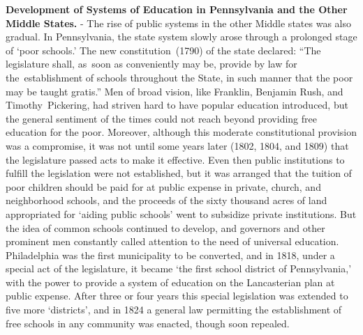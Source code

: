 \documentclass[]{book}
\begin{document}
\textbf{Development of Systems of Education in Pennsylvania and the Other Middle States.} - The rise of public systems in the other Middle states was also gradual. In Pennsylvania, the state system slowly arose through a prolonged stage of `poor schools.' The new constitution~(1790) of the state declared: ``The legislature shall, as~soon as conveniently may be, provide by law for the~establishment of schools throughout the State, in such manner that the poor may be taught gratis.'' Men of broad vision, like Franklin, Benjamin Rush, and Timothy~Pickering, had striven hard to have popular education introduced, but the general sentiment of the times could not reach beyond providing free education for the poor. Moreover, although this moderate constitutional provision was a compromise, it was not until some years later (1802, 1804, and 1809) that the legislature passed acts to make it effective. Even then public institutions to fulfill the legislation were not established, but it was arranged that the tuition of poor children should be paid for at public expense in private, church, and neighborhood schools, and the proceeds of the sixty thousand acres of land appropriated for `aiding public schools' went to subsidize private institutions. But the idea of common schools continued to develop, and governors and other prominent men constantly called attention to the need of universal education. Philadelphia was the first municipality to be converted, and in 1818, under a special act of the legislature, it became `the first school district of Pennsylvania,' with the power to provide a system of education on the Lancasterian plan at public expense. After three or four years this special legislation was extended to five more `districts', and in 1824 a general law permitting the establishment of free schools in any community was enacted, though soon repealed.
\end{document}
